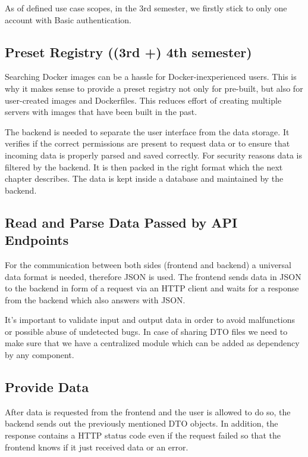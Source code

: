 \documentclass[a4paper,12pt,chapterprefix=false,bibliography=totoc,listof=totoc,]{scrreprt}
\newcommand{\gls}[1]{\uppercase{#1}}
\begin{document}
As of defined use case scopes, in the 3rd semester, we firstly stick to only one account with Basic authentication.

\subsection{Preset Registry ((3rd +) 4th semester)}
Searching Docker images can be a hassle for Docker-inexperienced users. This is why it makes sense to provide a preset registry not only for pre-built, but also for user-created images and Dockerfiles. This reduces effort of creating multiple servers with images that have been built in the past.

The backend is needed to separate the user interface from the data storage. It verifies if the correct permissions are present to request data or to ensure that incoming data is properly parsed and saved correctly. For security reasons data is filtered by the backend. It is then packed in the right format which the next chapter describes. The data is kept inside a database and maintained by the backend.


\subsection{Read and Parse Data Passed by API Endpoints}
For the communication between both sides (frontend and backend) a universal data format is needed, therefore JSON is used. The frontend sends data in JSON to the backend in form of a request via an HTTP client and waits for a response from the backend which also answers with JSON.

It's important to validate input and output data in order to avoid malfunctions or possible abuse of undetected bugs. In case of sharing \gls{dto} files we need to make sure that we have a centralized module which can be added as dependency by any component.

\subsection{Provide Data}
After data is requested from the frontend and the user is allowed to do so, the backend sends out the previously mentioned DTO objects. In addition, the response contains a HTTP status code even if the request failed so that the frontend knows if it just received data or an error.
\end{document}
